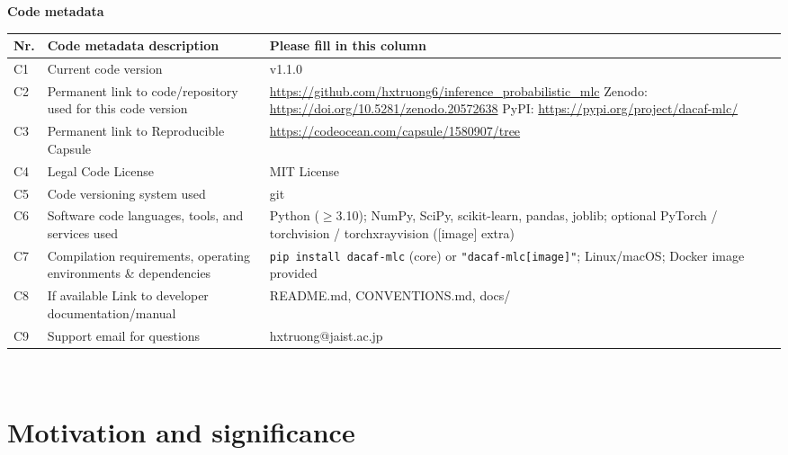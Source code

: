 \documentclass[11pt, letterpaper]{article}
\begin{document}
\noindent
\textbf{Code metadata}\\

\noindent
\begin{tabular}{|l|p{6.5cm}|p{9.5cm}|}
\hline
\textbf{Nr.} & \textbf{Code metadata description} & \textbf{Please fill in this column} \\
\hline
C1 & Current code version & v1.1.0 \\
\hline
C2 & Permanent link to code/repository used for this code version &
\url{https://github.com/hxtruong6/inference_probabilistic_mlc} \newline
Zenodo: \url{https://doi.org/10.5281/zenodo.20572638} \newline
PyPI: \url{https://pypi.org/project/dacaf-mlc/} \\
\hline
C3 & Permanent link to Reproducible Capsule &
\url{https://codeocean.com/capsule/1580907/tree} \\
\hline
C4 & Legal Code License & MIT License \\
\hline
C5 & Code versioning system used & git \\
\hline
C6 & Software code languages, tools, and services used &
Python ($\geq$3.10); NumPy, SciPy, scikit-learn, pandas, joblib;
optional PyTorch / torchvision / torchxrayvision ([image] extra) \\
\hline
C7 & Compilation requirements, operating environments \& dependencies &
\texttt{pip install dacaf-mlc} (core) or \texttt{"dacaf-mlc[image]"};
Linux/macOS; Docker image provided \\
\hline
C8 & If available Link to developer documentation/manual &
README.md, CONVENTIONS.md, docs/ \\
\hline
C9 & Support email for questions & hxtruong@jaist.ac.jp \\
\hline
\end{tabular}\\
\vskip0.5cm

\section{Motivation and significance}\label{sec:motivation}
\end{document}
